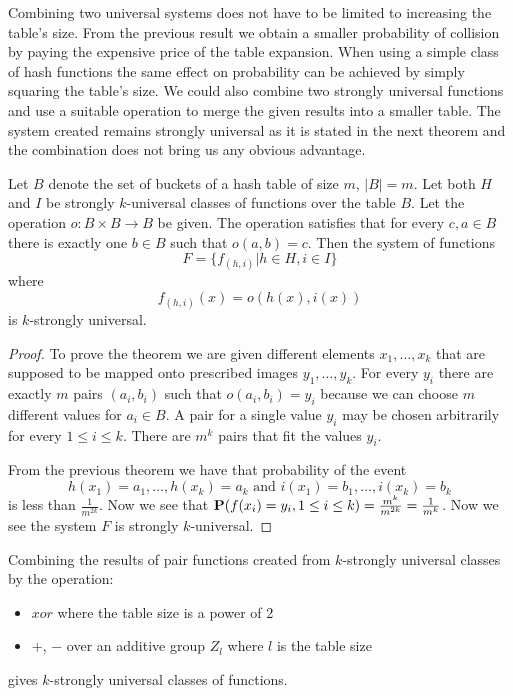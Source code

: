 Combining two universal systems does not have to be limited to increasing the table's size. From the previous result we obtain a smaller probability of collision by paying the expensive price of the table expansion. When using a simple class of hash functions the same effect on probability can be achieved by simply squaring the table's size. We could also combine two strongly universal functions and use a suitable operation to merge the given results into a smaller table. The system created remains strongly universal as it is stated in the next theorem and the combination does not bring us any obvious advantage.

\begin{theorem}
Let $B$ denote the set of buckets of a hash table of size $m$, $|B| = m$. Let both $H$ and $I$ be strongly $k$-universal classes of functions over the table $B$. Let the operation $o: B \times B \rightarrow B$ be given. The operation satisfies that for every $c, a \in B$ there is exactly one $b \in B$ such that $o(a, b) = c$. Then the system of functions \[F = \lbrace f_{(h, i)} | h \in H, i \in I \rbrace\] where \[f_{(h, i)}(x) = o(h(x), i(x))\] is $k$-strongly universal.
\end{theorem}
\begin{proof}
To prove the theorem we are given different elements $x_1, \dots, x_k$ that are supposed to be mapped onto prescribed images $y_1, \dots, y_k$. For every $y_i$ there are exactly $m$ pairs $(a_i, b_i)$ such that $o(a_i, b_i) = y_i$ because we can choose $m$ different values for $a_i \in B$. A pair for a single value $y_i$ may be chosen arbitrarily for every $1 \le i \le k$. There are $m^k$ pairs that fit the values $y_i$.

From the previous theorem we have that probability of the event \[ h(x_1) = a_1, \dots, h(x_k) = a_k \text{ and } i(x_1) = b_1, \dots, i(x_k) = b_k \] is less than $\frac{1}{m^{2k}}$. Now we see that $\mathbf{P}(f(x_i) = y_i, 1 \le i \le k) = \frac{m^k}{m^{2k}} = \frac{1}{m^k}$. Now we see the system $F$ is strongly $k$-universal.
\end{proof}

\begin{corollary}
Combining the results of pair functions created from $k$-strongly universal classes by the operation:
\begin{itemize}
\item $xor$ where the table size is a power of 2
\item $+$, $-$ over an additive group $Z_l$ where $l$ is the table size
\end{itemize}
gives $k$-strongly universal classes of functions.
\end{corollary}

